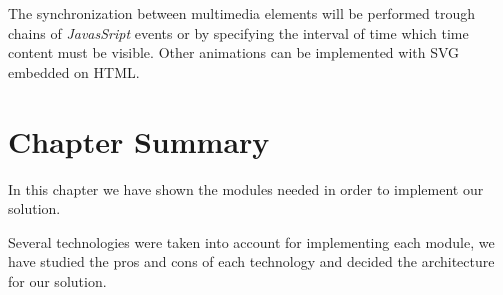 The synchronization between multimedia elements will be performed trough chains of \emph{JavasSript} events or by specifying the interval of time which time content must be visible. Other animations can be implemented with \ac{SVG} embedded on \ac{HTML}.

\section{Chapter Summary}
\label{architecture:summary}

In this chapter we have shown the modules needed in order to implement our solution.

Several technologies were taken into account for implementing each module, we have studied the pros and cons of each technology and decided the architecture for our solution.

